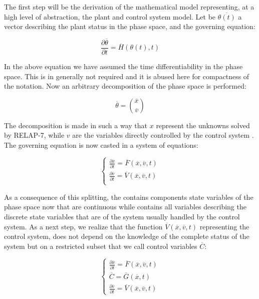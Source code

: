 \documentclass{mc2013}
\begin{document}
The first step will be the derivation of the mathematical model representing, at a high level of abstraction,
the plant and control system model. Let be $\overline{\theta(t)}$ a vector describing the plant status in the phase space, and the governing equation:

\begin{equation}
\frac{\partial \overline{\theta}}{\partial t} = \overline{H}(\theta(t),t)
\label{eq:SystemDynamics}
\end{equation}

In the above equation we have assumed the time differentiability in the phase space. This is in generally
not required and it is abused here for compactness of the notation. Now an arbitrary decomposition of the
phase space is performed:

\begin{equation}
\overline{\theta}=\binom{\overline{x}}{\overline{v}}
\label{eq:firstDecomposition}
\end{equation}

The decomposition is made in such a way that $x$ represent the unknowns solved by RELAP-7, while $v$ are the variables directly controlled by the control system . The governing equation is now casted in a system of equations:

\begin{equation}
\begin{cases} 
\frac{\partial \overline{x}}{\partial t} = \overline{F}(\overline{x},\overline{v},t) \\ 
\frac{\partial \overline{v}}{\partial t} = \overline{V}(\overline{x},\overline{v},t) \\
\end{cases}
\label{eq:generalSystemEquation}
\end{equation}

As a consequence of this splitting, the contains components state variables of the phase space now that
are continuous while contains all variables describing the discrete state variables that are of the system
usually handled by the control system. As a next step, we realize that the function 
$\overline{V}(\overline{x},\overline{v},t)$ 
representing the control system, does not depend on the knowledge of the complete status of the system but on a restricted subset that we call control variables $\overline{C}$:

\begin{equation}
\begin{cases} 
\frac{\partial \overline{x}}{\partial t} = \overline{F}(\overline{x},\overline{v},t) \\
\overline{C} = \overline{G}(\overline{x},t) \\ 
\frac{\partial \overline{v}}{\partial t} = \overline{V}(\overline{x},\overline{v},t) 
\end{cases}
\label{eq:generalSystemEquationwithControl}
\end{equation}
\end{document}
